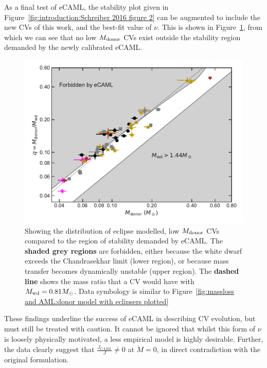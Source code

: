 As a final test of eCAML, the stability plot given in Figure~\ref{fig:introduction:Schreiber 2016 figure 2} can be augmented to include the new CVs of this work, and the best-fit value of $\nu$.
This is shown in Figure~\ref{fig:massloss and AML:calibrated eCAML}, from which we can see that no low $M_{\rm donor}$ CVs exist outside the stability region demanded by the newly calibrated eCAML.
\begin{figure}
    \centering
    \includegraphics[width=\textwidth]{figures/results/Mdot/ecaml_nointercept.pdf}
    \caption{Showing the distribution of eclipse modelled, low $M_{\rm donor}$ CVs compared to the region of stability demanded by eCAML. The {\bf shaded grey regions} are forbidden, either because the white dwarf exceeds the Chandrasekhar limit (lower region), or because mass transfer becomes dynamically unstable (upper region). The {\bf dashed line} shows the mass ratio that a CV would have with $M_{\rm wd} = 0.81 M_\odot$. Data symbology is similar to Figure~\ref{fig:massloss and AML:donor model with eclipsers plotted}}
    \label{fig:massloss and AML:calibrated eCAML}
\end{figure}
These findings underline the success of eCAML in describing CV evolution, but must still be treated with caution. It cannot be ignored that whilst this form of $\nu$ is loosely physically motivated, a less empirical model is highly desirable.
Further, the data clearly suggest that $\frac{\dot J_{CAML}}{J} \neq 0$ at $\dot M = 0$, in direct contradiction with the original formulation. 

